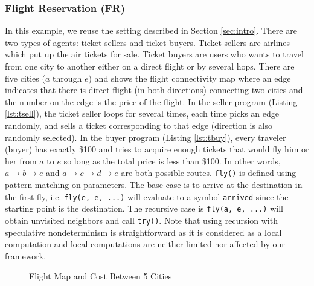 
\subsubsection*{Flight Reservation (FR)}

In this example, we reuse the setting described in Section \ref{sec:intro}.
There are two types of agents: ticket sellers and ticket buyers. Ticket sellers are 
airlines which put up the air tickets for sale. Ticket buyers
are users who wants to travel from one city to another either on a direct
flight or by several hops. 
There are five cities ($a$ through $e$) 
and  shows the flight connectivity map where 
an edge indicates that there is direct flight (in both directions) 
connecting two cities and the number on the edge is the price of the
flight. 
In the seller program (Listing \ref{lst:tsell}), 
the ticket seller loops for several times, 
each time picks an edge randomly, 
and sells a ticket corresponding to that edge
(direction is also randomly selected). 
In the buyer program (Listing \ref{lst:tbuy}), 
every traveler (buyer) has exactly \$100 and tries to acquire enough tickets
that would fly him or her from $a$ to $e$ so long as the total price is 
less than \$100. In other words, $a\to b\to e$ 
and $a\to c\to d\to e$ are both possible routes.
{\tt fly()} is defined using pattern matching on parameters.
The base case is to arrive at the destination in the first fly, i.e.
{\tt fly(e, e, ...)} will evaluate to a symbol {\tt arrived} since 
the starting point is the destination. 
The recursive case is {\tt fly(a, e, ...)} will obtain unvisited neighbors and call {\tt try()}.
Note that using recursion with speculative nondeterminism is straightforward
as it is considered as a local computation and 
local computations are neither limited nor affected by our framework.

\begin{figure}[tb]
\centering
{}
\caption{Flight Map and Cost Between 5 Cities}
\label{fig:flight}
\end{figure}

